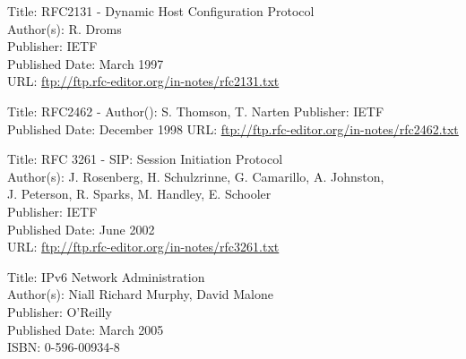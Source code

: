 \documentclass[a4paper,12pt]{article}
\begin{document}
Title: RFC2131 - Dynamic Host Configuration Protocol \\
Author(s): R. Droms \\
Publisher: IETF \\
Published Date: March 1997 \\
URL: \url{ftp://ftp.rfc-editor.org/in-notes/rfc2131.txt}	 

Title: RFC2462 - 
Author(): S. Thomson, T. Narten
Publisher: IETF \\
Published Date: December 1998
URL: \url{ftp://ftp.rfc-editor.org/in-notes/rfc2462.txt}	 

Title: RFC 3261 - SIP: Session Initiation Protocol \\
Author(s): J. Rosenberg, H. Schulzrinne, G. Camarillo, A. Johnston, \\
\indent J. Peterson, R. Sparks, M. Handley, E. Schooler \\
Publisher: IETF \\
Published Date: June 2002  \\
URL: \url{ftp://ftp.rfc-editor.org/in-notes/rfc3261.txt}	 

Title: IPv6 Network Administration \\
Author(s): Niall Richard Murphy, David Malone \\
Publisher: O'Reilly \\
Published Date: March 2005  \\
ISBN: 0-596-00934-8	 
\end{document}
